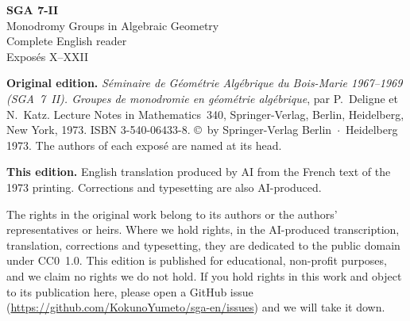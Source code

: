 \documentclass[11pt,a4paper,leqno]{article}
\begin{document}

\begin{titlepage}
\centering
\vspace*{2.2in}
{\LARGE\textbf{SGA 7-II}}\\[0.6em]
{\Large Monodromy Groups in Algebraic Geometry}\\[1.5em]
{\large Complete English reader}\\[1.2em]
{\normalsize Exposés X--XXII}
\vfill
\end{titlepage}
\clearpage
\thispagestyle{empty}
\null\vfill
\begingroup\small
\noindent\textbf{Original edition.} \textit{S\'eminaire de G\'eom\'etrie Alg\'ebrique du Bois-Marie 1967--1969 (SGA~7~II). Groupes de monodromie en g\'eom\'etrie alg\'ebrique}, par P.~Deligne et N.~Katz. Lecture Notes in Mathematics~340, Springer-Verlag, Berlin, Heidelberg, New York, 1973. ISBN 3-540-06433-8. \copyright{}~by Springer-Verlag Berlin~$\cdot$~Heidelberg 1973. The authors of each expos\'e are named at its head.\par
\medskip
\noindent\textbf{This edition.} English translation produced by AI from the French text of the 1973 printing. Corrections and typesetting are also AI-produced.\par
\medskip
\noindent The rights in the original work belong to its authors or the authors' representatives or heirs. Where we hold rights, in the AI-produced transcription, translation, corrections and typesetting, they are dedicated to the public domain under CC0~1.0. This edition is published for educational, non-profit purposes, and we claim no rights we do not hold. If you hold rights in this work and object to its publication here, please open a GitHub issue (\url{https://github.com/KokunoYumeto/sga-en/issues}) and we will take it down.\par
\endgroup
\clearpage
\tableofcontents
\clearpage
\end{document}
